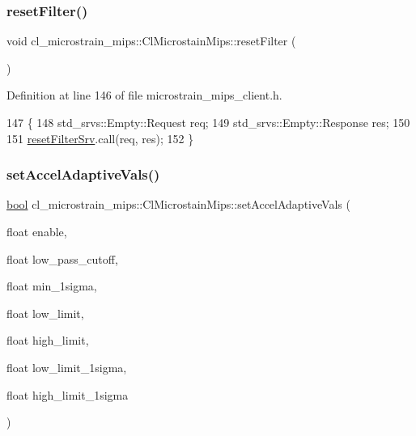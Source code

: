 \subsubsection{\texorpdfstring{reset\+Filter()}{resetFilter()}}
{\footnotesize\ttfamily void cl\+\_\+microstrain\+\_\+mips\+::\+Cl\+Microstain\+Mips\+::reset\+Filter (\begin{DoxyParamCaption}{ }\end{DoxyParamCaption})\hspace{0.3cm}{\ttfamily [inline]}}



Definition at line 146 of file microstrain\+\_\+mips\+\_\+client.\+h.


\begin{DoxyCode}
147     \{
148         std\_srvs::Empty::Request req;
149         std\_srvs::Empty::Response res;
150 
151         \hyperlink{classcl__microstrain__mips_1_1ClMicrostainMips_a3d9eb5c291d70a2fb1b9bde4392e1d48}{resetFilterSrv}.call(req, res);
152     \}
\end{DoxyCode}
\mbox{\label{classcl__microstrain__mips_1_1ClMicrostainMips_a4687c5a4ea6de01c41d96f3aeb58fa24}} 
\subsubsection{\texorpdfstring{set\+Accel\+Adaptive\+Vals()}{setAccelAdaptiveVals()}}
{\footnotesize\ttfamily \hyperlink{classbool}{bool} cl\+\_\+microstrain\+\_\+mips\+::\+Cl\+Microstain\+Mips\+::set\+Accel\+Adaptive\+Vals (\begin{DoxyParamCaption}\item[{float}]{enable,  }\item[{float}]{low\+\_\+pass\+\_\+cutoff,  }\item[{float}]{min\+\_\+1sigma,  }\item[{float}]{low\+\_\+limit,  }\item[{float}]{high\+\_\+limit,  }\item[{float}]{low\+\_\+limit\+\_\+1sigma,  }\item[{float}]{high\+\_\+limit\+\_\+1sigma }\end{DoxyParamCaption})\hspace{0.3cm}{\ttfamily [inline]}}



